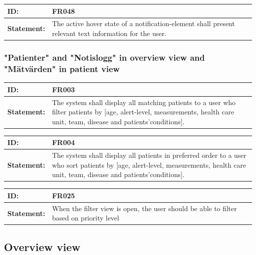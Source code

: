 \documentclass{scrreprt}
\begin{document}
\begin{center}
\begin{tabularx}{\linewidth}{| l | X |}
 \hline
 \textbf{ID:} & FR048  \\ 
 \hline
 \textbf{Statement:} & The active hover state of a notification-element shall present relevant text information for the user.  \\ 
 \hline
\end{tabularx}

\end{center}

\subsubsection{"Patienter" and "Notislogg" in overview view and "Mätvärden" in patient view}

\begin{center}
\begin{tabularx}{\linewidth}{| l | X |}
 \hline
 \textbf{ID:} & FR003  \\ 
 \hline
 \textbf{Statement:} & The system shall display all matching patients to a user who filter patients by [age, alert-level, measurements, health care unit, team, disease and patients’conditions]. \\ 
 \hline
\end{tabularx}

\begin{tabularx}{\linewidth}{| l | X |}
 \hline
 \textbf{ID:} & FR004  \\ 
 \hline
 \textbf{Statement:} & The system shall display all patients in preferred order to a user who sort patients by [age, alert-level, measurements, health care unit, team, disease and patients’conditions]. \\ 
 \hline
\end{tabularx}

\begin{tabularx}{\linewidth}{| l | X |}
 \hline
 \textbf{ID:} & FR025  \\ 
 \hline
 \textbf{Statement:} & When the filter view is open, the user should be able to filter based on priority level \\ 
 \hline
\end{tabularx}

\end{center}

\subsection{Overview view}
\end{document}
